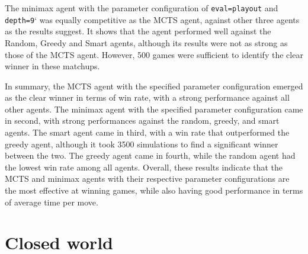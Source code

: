 The minimax agent with the parameter configuration of \texttt{eval=playout} and \texttt{depth=9}` was equally competitive as the MCTS agent, against other three agents as the results suggest. It shows that the agent performed well against the Random, Greedy and Smart agents, although its results were not as strong as those of the MCTS agent. However, 500 games were sufficient to identify the clear winner in these matchups. 

In summary, the MCTS agent with the specified parameter configuration emerged as the clear winner in terms of win rate, with a strong performance against all other agents. The minimax agent with the specified parameter configuration came in second, with strong performances against the random, greedy, and smart agents. The smart agent came in third, with a win rate that outperformed the greedy agent, although it took 3500 simulations to find a significant winner between the two. The greedy agent came in fourth, while the random agent had the lowest win rate among all agents. Overall, these results indicate that the MCTS and minimax agents with their respective parameter configurations are the most effective at winning games, while also having good performance in terms of average time per move.

\section{Closed world}
